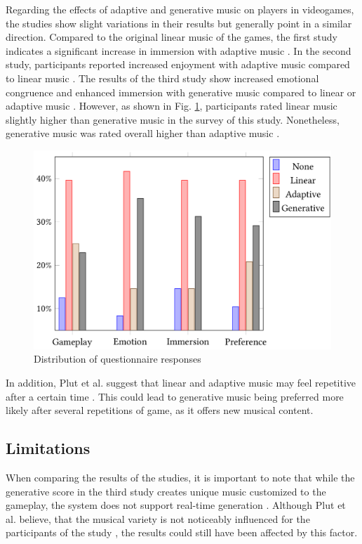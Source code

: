 Regarding the effects of adaptive and generative music on players in videogames, the studies show slight variations in their results but generally point in a similar direction. 
Compared to the original linear music of the games, the first study indicates a significant increase in immersion with adaptive music \cite{hutMcCormAms}. In the second study, participants reported increased enjoyment with adaptive music compared to linear music \cite{plut2019music}. The results of the third study show increased emotional congruence and enhanced immersion with generative music compared to linear or adaptive music \cite{plut2022preglam}. However, as shown in Fig. \ref{fig:preglamm_mmm_questionnaire_responses}, participants rated linear music slightly higher than generative music in the survey of this study. Nonetheless, generative music was rated overall higher than adaptive music \cite{plut2022preglam}.
\begin{figure}[h]
    \centering
    \includegraphics[width=1\linewidth]{images/preglamm_mmm_questionnaire_responses.png}
    \caption{Distribution of questionnaire responses \cite{plut2022preglam}}
    \label{fig:preglamm_mmm_questionnaire_responses}
\end{figure}
In addition, Plut et al. suggest that linear and adaptive music may feel repetitive after a certain time \cite{plut2022preglam}. This could lead to generative music being preferred more likely after several repetitions of game, as it offers new musical content.

\subsection{Limitations}
When comparing the results of the studies, it is important to note that while the generative score in the third study creates unique music customized to the gameplay, the system does not support real-time generation \cite{plut2022preglam}. Although Plut et al. believe, that the musical variety is not noticeably influenced for the participants of the study \cite{plut2022preglam}, the results could still have been affected by this factor. 


